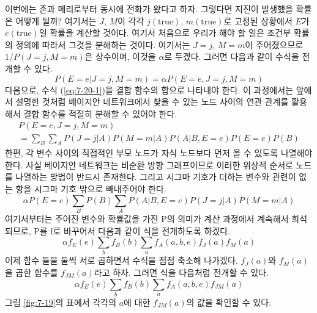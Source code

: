 \documentclass[a4paper]{oblivoir}
\begin{document}
이번에는 존과 메리로부터 동시에 전화가 왔다고 하자. 그렇다면 지진이 발생했을 확률은 어떻게 될까? 여기서는 $J$, $M$이 각각 $j(\textrm{true})$, $m(\textrm{true})$로 고정된 상황에서 $E$가 $e(\textrm{true})$일 확률을 계산할 것이다. 여기서 처음으로 우리가 해야 할 일은 조건부 확률의 정의에 따라서 그것을 분해하는 것이다. 여기서는 $J=j$, $M=m$이 주어졌으므로 $1/P(J=j, M=m)$은 상수이며, 이것을 $\alpha$로 두겠다. 그러면 다음과 같이 수식을 전개할 수 있다.
\begin{equation}
P(E=e | J=j, M=m) = \alpha P(E=e, J=j, M=m) 
\label{eq:7-20-1}
\end{equation}
다음으로, 수식 (\ref{eq:7-20-1})을 결합 함수의 합으로 나타내야 한다. 이 과정에서는 앞에서 설명한 것처럼 베이지안 네트워크에서 찾을 수 있는 노드 사이의 연관 관계를 활용해서 결합 함수를 적절히 분해할 수 있어야 한다. 
\begin{eqnarray}
P(E=e, J=j, M=m) \ \ \ \ \ \  \ \ \ \ \ \ \ \ \ \  \ \ \ \ \ \ \ \ \ \ \ \ \ \ \ \ \ \ \ \ \ \ \ \ \ \  \ \ \ \ \ \nonumber \\
= \sum_{B} \sum_{A} P(J=j|A) P(M=m|A) P(A|B,E=e) P(E=e) P(B) \label{eq:7-20}
\end{eqnarray}
한편, 각 변수 사이의 직접적인 부모 노드가 자식 노드보다 먼저 올 수 있도록 나열해야 한다. 사실 베이지안 네트워크는 비순환 방향 그래프이므로 이러한 위상적 순서로 노드를 나열하는 방법이 반드시 존재한다. 그리고 시그마 기호가 더하는 변수와 관련이 없는 항을 시그마 기호 밖으로 빼내주어야 한다. 
\begin{equation}
\alpha P(E=e) \sum_{B} P(B) \sum_{A} P(A|B,E=e) P(J=j|A) P(M=m|A)
\label{eq:7-21}
\end{equation}
여기서부터는 주어진 변수와 확률값을 가진 P의 의미가 계산 과정에서 계속해서 희석되므로, P를 f로 바꾸어서 다음과 같이 식을 전개하도록 하겠다. 
\begin{equation}
\alpha f_{E}(e) \sum_{b} f_{B}(b) \sum_{a} f_{A}(a,b,e) f_{J}(a) f_{M}(a)
\label{eq:7-23}
\end{equation}
이제 함수 들을 둘씩 서로 곱하면서 수식을 점점 축소해 나가겠다. $f_{J}(a)$와 $f_{M}(a)$을 곱한 함수를 $f_{JM}(a)$라고 하자. 그러면 식을 다음처럼 전개할 수 있다. 
\begin{equation}
\alpha f_{E}(e) \sum_{b} f_{B}(b) \sum_{a} f_{A}(a,b,e) f_{JM}(a)
\label{eq:7-24}
\end{equation}
그림 \ref{fig:7-19}의 표에서 각각의 $a$에 대한 $f_{JM}(a)$의 값을 확인할 수 있다.  
 
\end{document}
